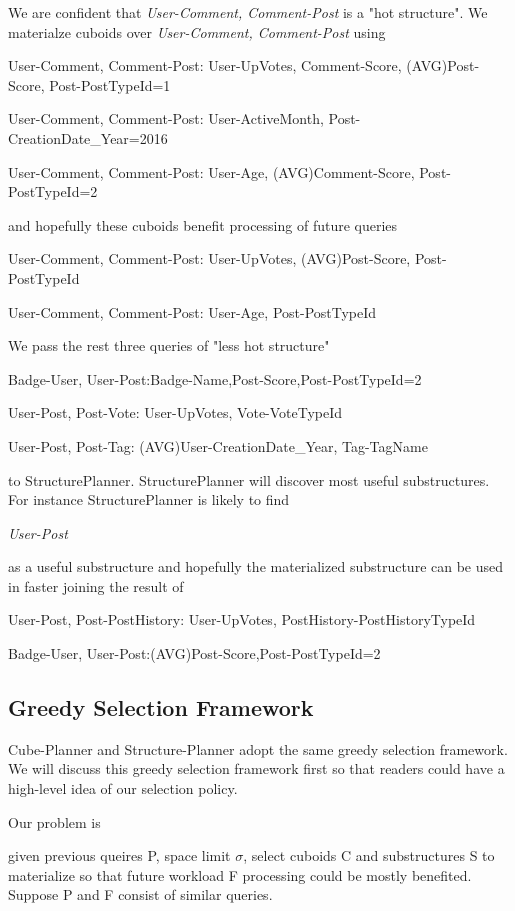 We are confident that \textit{User-Comment, Comment-Post} is a "hot structure". We materialze cuboids over \textit{User-Comment, Comment-Post} using

User-Comment, Comment-Post: User-UpVotes, Comment-Score, (AVG)Post-Score, Post-PostTypeId=1

User-Comment, Comment-Post: User-ActiveMonth, Post-CreationDate_Year=2016

User-Comment, Comment-Post: User-Age, (AVG)Comment-Score, Post-PostTypeId=2

and hopefully these cuboids benefit processing of future queries

User-Comment, Comment-Post: User-UpVotes, (AVG)Post-Score, Post-PostTypeId

User-Comment, Comment-Post: User-Age, Post-PostTypeId

We pass the rest three queries of "less hot structure" 

Badge-User, User-Post:Badge-Name,Post-Score,Post-PostTypeId=2

User-Post, Post-Vote: User-UpVotes, Vote-VoteTypeId

User-Post, Post-Tag: (AVG)User-CreationDate_Year, Tag-TagName

to StructurePlanner. StructurePlanner will discover most useful substructures. For instance StructurePlanner is likely to find

\textit{User-Post }

as a useful substructure and hopefully the materialized substructure can be used in faster joining the result of 

User-Post, Post-PostHistory: User-UpVotes, PostHistory-PostHistoryTypeId

Badge-User, User-Post:(AVG)Post-Score,Post-PostTypeId=2

\subsection{Greedy Selection Framework}

Cube-Planner and Structure-Planner adopt the same greedy selection framework. We will discuss this greedy selection framework first so that readers could have a high-level idea of our selection policy.

 Our problem is  

given previous queires P, space limit $\sigma$, select cuboids C and substructures S to materialize so that future workload F processing could be mostly benefited. Suppose P and F consist of similar queries.
 
